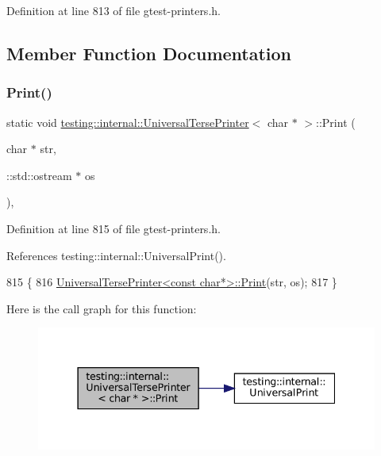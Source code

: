 Definition at line 813 of file gtest-\/printers.\+h.



\subsection{Member Function Documentation}
\mbox{\label{classtesting_1_1internal_1_1UniversalTersePrinter_3_01char_01_5_01_4_aa9ef95587c1461fe33e254af52401a43}} 
\subsubsection{\texorpdfstring{Print()}{Print()}}
{\footnotesize\ttfamily static void \hyperlink{classtesting_1_1internal_1_1UniversalTersePrinter}{testing\+::internal\+::\+Universal\+Terse\+Printer}$<$ char $\ast$ $>$\+::Print (\begin{DoxyParamCaption}\item[{char $\ast$}]{str,  }\item[{\+::std\+::ostream $\ast$}]{os }\end{DoxyParamCaption})\hspace{0.3cm}{\ttfamily [inline]}, {\ttfamily [static]}}



Definition at line 815 of file gtest-\/printers.\+h.



References testing\+::internal\+::\+Universal\+Print().


\begin{DoxyCode}
815                                                \{
816     \hyperlink{classtesting_1_1internal_1_1UniversalTersePrinter_a042249cdb42fdb77588c9ad54ea7ed54}{UniversalTersePrinter<const char*>::Print}(str, os);
817   \}
\end{DoxyCode}
Here is the call graph for this function\+:
\nopagebreak
\begin{figure}[H]
\begin{center}
\leavevmode
\includegraphics[width=337pt]{classtesting_1_1internal_1_1UniversalTersePrinter_3_01char_01_5_01_4_aa9ef95587c1461fe33e254af52401a43_cgraph}
\end{center}
\end{figure}


